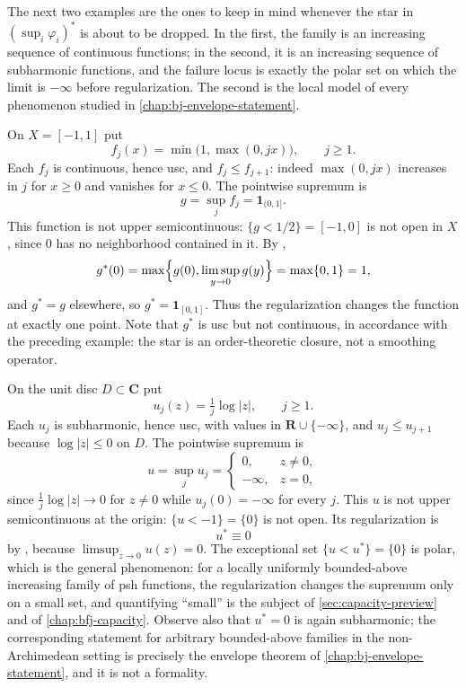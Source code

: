 The next two examples are the ones to keep in mind whenever the star in
$(\sup_i\varphi_i)^*$ is about to be dropped.  In the first, the family is an
increasing sequence of continuous functions; in the second, it is an
increasing sequence of subharmonic functions, and the failure locus is exactly
the polar set on which the limit is $-\infty$ before regularization.  The
second is the local model of every phenomenon studied in
\cref{chap:bj-envelope-statement}.

\begin{example}
\label{ex:sup-not-usc}
On $X=[-1,1]$ put
\[
 f_j(x)=\min\bigl(1,\max(0,jx)\bigr),\qquad j\geq1 .
\]
Each $f_j$ is continuous, hence usc, and $f_j\leq f_{j+1}$: indeed
$\max(0,jx)$ increases in $j$ for $x\geq0$ and vanishes for $x\leq0$.  The
pointwise supremum is
\[
 g=\sup_jf_j=\mathbf 1_{(0,1]} .
\]
This function is not upper semicontinuous: $\{g<1/2\}=[-1,0]$ is not open in
$X$, since $0$ has no neighborhood contained in it.  By
,
\[
 g^*(0)=\max\Bigl\{g(0),\limsup_{y\to0}g(y)\Bigr\}=\max\{0,1\}=1,
\]
and $g^*=g$ elsewhere, so $g^*=\mathbf 1_{[0,1]}$.  Thus the regularization
changes the function at exactly one point.  Note that
$g^*$ is usc but not continuous, in accordance with the preceding example: the
star is an order-theoretic closure, not a smoothing operator.
\end{example}

\begin{example}
\label{ex:sup-not-usc-log}
On the unit disc $D\subset\mathbf C$ put
\[
 u_j(z)=\tfrac1j\log|z|,\qquad j\geq1 .
\]
Each $u_j$ is subharmonic, hence usc, with values in
$\mathbf R\cup\{-\infty\}$, and $u_j\leq u_{j+1}$ because $\log|z|\leq0$ on
$D$.  The pointwise supremum is
\[
 u=\sup_ju_j=
 \begin{cases}
 0,& z\neq0,\\
 -\infty,& z=0,
 \end{cases}
\]
since $\tfrac1j\log|z|\to0$ for $z\neq0$ while $u_j(0)=-\infty$ for every $j$.
This $u$ is not upper semicontinuous at the origin: $\{u<-1\}=\{0\}$ is not
open.  Its regularization is
\[
 u^*\equiv0
\]
by , because
$\limsup_{z\to0}u(z)=0$.  The exceptional set $\{u<u^*\}=\{0\}$ is polar,
which is the general phenomenon: for a locally uniformly bounded-above
increasing family of psh functions, the regularization changes the supremum
only on a small set, and quantifying
``small'' is the subject of \cref{sec:capacity-preview} and of
\cref{chap:bfj-capacity}.  Observe also that $u^*=0$ is again subharmonic;
the corresponding statement for arbitrary bounded-above families in the
non-Archimedean setting is precisely the envelope theorem of
\cref{chap:bj-envelope-statement}, and it is not a formality.
\end{example}

